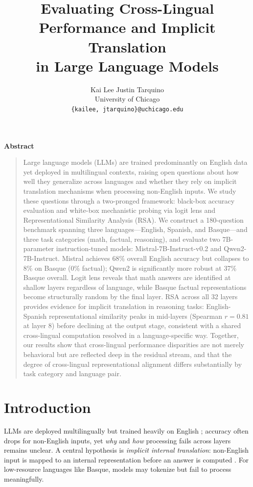 \documentclass[10pt]{article}
\title{\textbf{Evaluating Cross-Lingual Performance and Implicit Translation\\
in Large Language Models}}
\author{
  Kai Lee \quad Justin Tarquino \\
  University of Chicago \\
  \texttt{\{kailee, jtarquino\}@uchicago.edu}
}
\date{}
\renewenvironment{abstract}{%
  \begin{center}
    \textbf{Abstract}
  \end{center}
  \begin{quote}
}{%
  \end{quote}
  \vspace{0.5em}
}
\begin{document}
\maketitle

\begin{abstract}
Large language models (LLMs) are trained predominantly on English data yet deployed in
multilingual contexts, raising open questions about how well they generalize across
languages and whether they rely on implicit translation mechanisms when processing
non-English inputs. We study these questions through a two-pronged framework: black-box
accuracy evaluation and white-box mechanistic probing via logit lens and
Representational Similarity Analysis (RSA). We construct a 180-question benchmark
spanning three languages---English, Spanish, and Basque---and three task categories
(math, factual, reasoning), and evaluate two 7B-parameter instruction-tuned models:
Mistral-7B-Instruct-v0.2 and Qwen2-7B-Instruct. Mistral achieves 68\% overall
English accuracy but collapses to 8\% on Basque (0\% factual); Qwen2 is significantly
more robust at 37\% Basque overall. Logit lens reveals that math answers are identified
at shallow layers regardless of language, while Basque factual representations become
structurally random by the final layer. RSA across all 32 layers provides evidence for
implicit translation in reasoning tasks: English-Spanish representational similarity
peaks in mid-layers (Spearman \(r = 0.81\) at layer 8) before declining at the output
stage, consistent with a shared cross-lingual computation resolved in a
language-specific way. Together, our results show that cross-lingual performance
disparities are not merely behavioral but are reflected deep in the residual stream,
and that the degree of cross-lingual representational alignment differs substantially
by task category and language pair.
\end{abstract}

\section{Introduction}

LLMs are deployed multilingually but trained heavily on English \citep{ahuja2023mega}; accuracy often drops for non-English inputs, yet \emph{why} and \emph{how} processing fails across layers remains unclear. A central hypothesis is \emph{implicit internal translation}: non-English input is mapped to an internal representation before an answer is computed \citep{wendler2024llamas}. For low-resource languages like Basque, models may tokenize but fail to process meaningfully.
\end{document}
